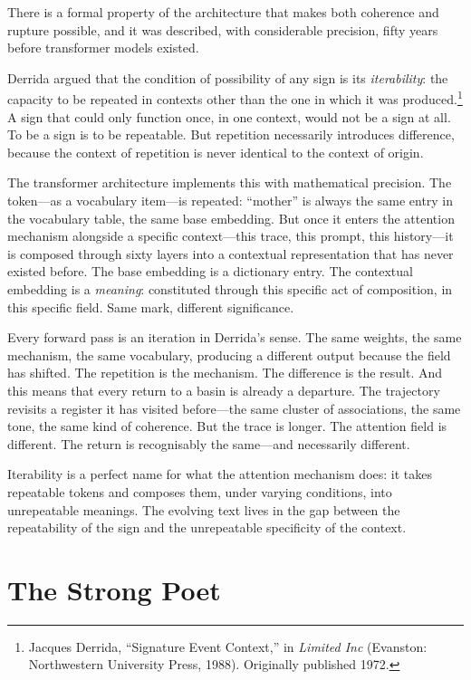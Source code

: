 There is a formal property of the architecture that makes both coherence and rupture possible, and it was described, with considerable precision, fifty years before transformer models existed.

Derrida argued that the condition of possibility of any sign is its \emph{iterability}: the capacity to be repeated in contexts other than the one in which it was produced.\footnote{Jacques Derrida, ``Signature Event Context,'' in \emph{Limited Inc} (Evanston: Northwestern University Press, 1988). Originally published 1972.} A sign that could only function once, in one context, would not be a sign at all. To be a sign is to be repeatable. But repetition necessarily introduces difference, because the context of repetition is never identical to the context of origin.

The transformer architecture implements this with mathematical precision. The token---as a vocabulary item---is repeated: ``mother'' is always the same entry in the vocabulary table, the same base embedding. But once it enters the attention mechanism alongside a specific context---this trace, this prompt, this history---it is composed through sixty layers into a contextual representation that has never existed before. The base embedding is a dictionary entry. The contextual embedding is a \emph{meaning}: constituted through this specific act of composition, in this specific field. Same mark, different significance.

Every forward pass is an iteration in Derrida's sense. The same weights, the same mechanism, the same vocabulary, producing a different output because the field has shifted. The repetition is the mechanism. The difference is the result. And this means that every return to a basin is already a departure. The trajectory revisits a register it has visited before---the same cluster of associations, the same tone, the same kind of coherence. But the trace is longer. The attention field is different. The return is recognisably the same---and necessarily different.

Iterability is a perfect name for what the attention mechanism does: it takes repeatable tokens and composes them, under varying conditions, into unrepeatable meanings. The evolving text lives in the gap between the repeatability of the sign and the unrepeatable specificity of the context.


\section{The Strong Poet}

